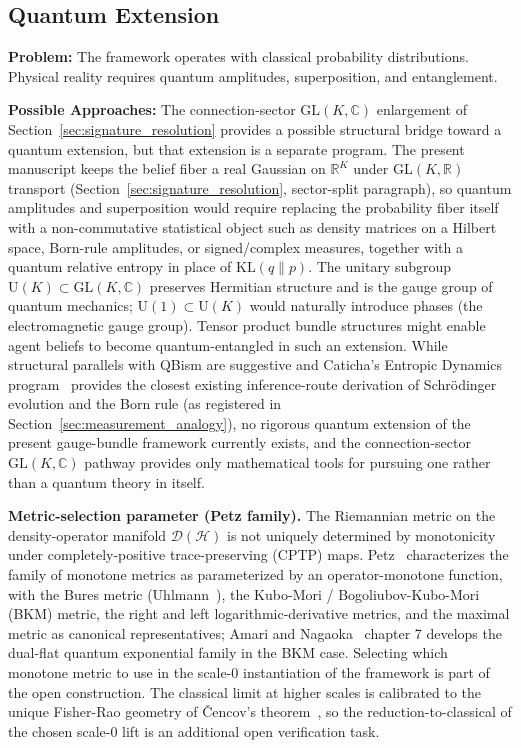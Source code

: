 \documentclass[11pt]{article}
\begin{document}
\subsection{Quantum Extension}

\textbf{Problem:} The framework operates with classical probability distributions. Physical reality requires quantum amplitudes, superposition, and entanglement.

\textbf{Possible Approaches:} The connection-sector $\mathrm{GL}(K, \mathbb{C})$ enlargement of Section~\ref{sec:signature_resolution} provides a possible structural bridge toward a quantum extension, but that extension is a separate program. The present manuscript keeps the belief fiber a real Gaussian on $\mathbb{R}^K$ under $\mathrm{GL}(K, \mathbb{R})$ transport (Section~\ref{sec:signature_resolution}, sector-split paragraph), so quantum amplitudes and superposition would require replacing the probability fiber itself with a non-commutative statistical object such as density matrices on a Hilbert space, Born-rule amplitudes, or signed/complex measures, together with a quantum relative entropy in place of $\mathrm{KL}(q \| p)$. The unitary subgroup $\mathrm{U}(K) \subset \mathrm{GL}(K, \mathbb{C})$ preserves Hermitian structure and is the gauge group of quantum mechanics; $\mathrm{U}(1) \subset \mathrm{U}(K)$ would naturally introduce phases (the electromagnetic gauge group). Tensor product bundle structures might enable agent beliefs to become quantum-entangled in such an extension. While structural parallels with QBism are suggestive and Caticha's Entropic Dynamics program~\cite{Caticha2015, Caticha2019, JohnsonCaticha2011} provides the closest existing inference-route derivation of Schr\"odinger evolution and the Born rule (as registered in Section~\ref{sec:measurement_analogy}), no rigorous quantum extension of the present gauge-bundle framework currently exists, and the connection-sector $\mathrm{GL}(K, \mathbb{C})$ pathway provides only mathematical tools for pursuing one rather than a quantum theory in itself.

\textbf{Metric-selection parameter (Petz family).} The Riemannian metric on the density-operator manifold $\mathcal{D}(\mathcal{H})$ is not uniquely determined by monotonicity under completely-positive trace-preserving (CPTP) maps. Petz~\cite{Petz1996} characterizes the family of monotone metrics as parameterized by an operator-monotone function, with the Bures metric (Uhlmann~\cite{Uhlmann1976}), the Kubo-Mori / Bogoliubov-Kubo-Mori (BKM) metric, the right and left logarithmic-derivative metrics, and the maximal metric as canonical representatives; Amari and Nagaoka~\cite{AmariNagaoka2000} chapter 7 develops the dual-flat quantum exponential family in the BKM case. Selecting which monotone metric to use in the scale-0 instantiation of the framework is part of the open construction. The classical limit at higher scales is calibrated to the unique Fisher-Rao geometry of \v{C}encov's theorem~\cite{Cencov1982}, so the reduction-to-classical of the chosen scale-0 lift is an additional open verification task.
\end{document}
